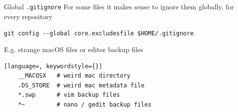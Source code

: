 \begin{frame}[fragile]{Global \texttt{.gitignore}}
  For some files it makes sense to ignore them globally, for every repository

  \lstinline+git config --global core.excludesfile $HOME/.gitignore+

  E.g. strange macOS files or editor backup files

  \begin{lstlisting}[language=, keywordstyle={}]
    __MACOSX   # weird mac directory
    .DS_STORE  # weird mac metadata file
    *.swp      # vim backup files
    *~         # nano / gedit backup files
  \end{lstlisting}

\end{frame}

